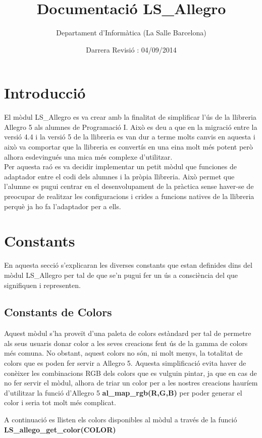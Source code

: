 \documentclass[11pt]{article}
\title{Documentació LS\_Allegro}
\author{Departament d'Informàtica (La Salle Barcelona)}
\date{Darrera Revisió : 04/09/2014}
\begin{document}
\maketitle

\tableofcontents

\pagebreak


\section{Introducció}
El mòdul LS\_Allegro es va crear amb la finalitat de simplificar l'ús de la llibreria Allegro 5 als alumnes de Programació I. Això es deu a que en la migració entre la versió 4.4 i la versió 5 de la llibreria es van dur a terme molts canvis en aquesta i això va comportar que la llibreria es convertís en una eina molt més potent però alhora esdevingués una mica més complexe d'utilitzar.\\
Per aquesta raó es va decidir implementar un petit mòdul que funciones de adaptador entre el codi dels alumnes i la pròpia llibreria. Això permet que l'alumne es pugui centrar en el desenvolupament de la pràctica sense haver-se de preocupar de realitzar les configuracions i crides a funcions natives de la llibreria perquè ja ho fa l'adaptador per a ells.


\section{Constants}
En aquesta secció s'explicaran les diverses constants que estan definides dins del mòdul LS\_Allegro per tal de que se'n pugui fer un ús a consciència del que signifiquen i representen.

\subsection{Constants de Colors}
Aquest mòdul s'ha proveït d'una paleta de colors estàndard per tal de permetre als seus usuaris donar color a les seves creacions fent ús de la gamma de colors més comuna. No obstant, aquest colors no són, ni molt menys, la totalitat de colors que es poden fer servir a Allegro 5. Aquesta simplificació evita haver de conèixer les combinacions RGB dels colors que es vulguin pintar, ja que en cas de no fer servir el mòdul, alhora de triar un color per a les nostres creacions hauríem d'utilitzar la funció d'Allegro 5 \textbf{al\_map\_rgb(R,G,B)} per poder generar el color i seria tot molt més complicat.

\pagebreak 
\noindent A continuació es llisten els colors disponibles al mòdul a través de la funció \textbf{LS\_allego\_get\_color(COLOR)}
\end{document}

